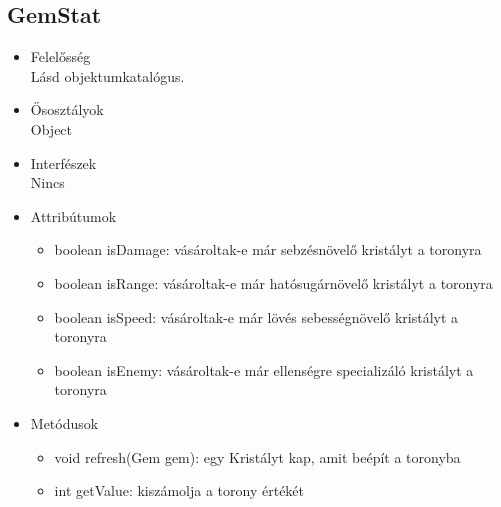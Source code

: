 \subsection{GemStat}
\begin{itemize}
\item Felelősség\\
 Lásd objektumkatalógus.
\item Ősosztályok\\
Object
\item Interfészek\\
Nincs
\item Attribútumok\\
	\begin{itemize}
		\item boolean isDamage: vásároltak-e már sebzésnövelő kristályt a toronyra
		\item boolean isRange: vásároltak-e már hatósugárnövelő kristályt a toronyra
		\item boolean isSpeed: vásároltak-e már lövés sebességnövelő kristályt a toronyra
		\item boolean isEnemy: vásároltak-e már ellenségre specializáló kristályt a toronyra 

		
	\end{itemize}
\item Metódusok\\
	\begin{itemize}
	
		\item void refresh(Gem gem): egy Kristályt kap, amit beépít a toronyba
		\item int getValue: kiszámolja a torony értékét
		
		
	\end{itemize}
\end{itemize}
